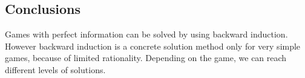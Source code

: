 \subsection{Conclusions}
Games with perfect information can be solved by using backward induction. 
However backward induction is a concrete solution method only for very simple games, because of limited rationality.
Depending on the game, we can reach different levels of solutions.